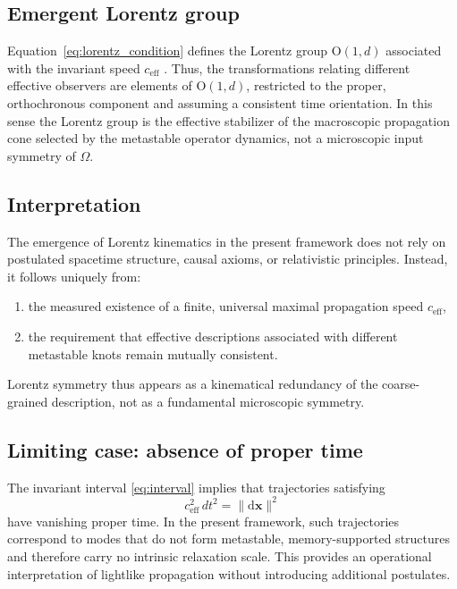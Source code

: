 \documentclass[reprint,amsmath,amssymb,aps,prl,nofootinbib,floatfix]{revtex4-2}
\begin{document}
\subsection{Emergent Lorentz group}

Equation~\eqref{eq:lorentz_condition} defines the Lorentz group
$\mathrm{O}(1,d)$ associated with the invariant speed $c_{\mathrm{eff}}$ \cite{Einstein1905,Rindler2006}.
Thus, the transformations relating different effective observers are elements of $\mathrm{O}(1,d)$, restricted to the proper, orthochronous component and assuming a consistent time orientation.
In this sense the Lorentz group is the effective stabilizer of the macroscopic propagation cone selected by the metastable operator dynamics, not a microscopic input symmetry of $\Omega$.

\subsection{Interpretation}

The emergence of Lorentz kinematics in the present framework does not rely on postulated spacetime structure, causal axioms, or relativistic principles.
Instead, it follows uniquely from:
\begin{enumerate}
\item the measured existence of a finite, universal maximal propagation speed $c_{\mathrm{eff}}$,
\item the requirement that effective descriptions associated with different metastable knots remain mutually consistent.
\end{enumerate}

Lorentz symmetry thus appears as a kinematical redundancy of the coarse-grained description, not as a fundamental microscopic symmetry.

\subsection{Limiting case: absence of proper time}

The invariant interval \eqref{eq:interval} implies that trajectories satisfying
\begin{equation}
c_{\mathrm{eff}}^2\,dt^2 = \|\mathrm d\mathbf{x}\|^2
\label{eq:null}
\end{equation}
have vanishing proper time.
In the present framework, such trajectories correspond to modes that do not form metastable, memory-supported structures and therefore carry no intrinsic relaxation scale.
This provides an operational interpretation of lightlike propagation without introducing additional postulates.
\end{document}
